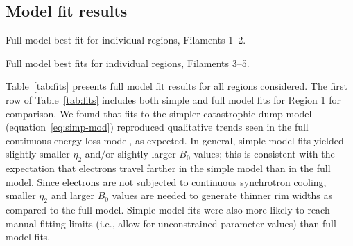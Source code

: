 \documentclass[iop, apj, numberedappendix, twocolappendix]{emulateapj}
\begin{document}
\subsection{Model fit results}
\label{sec:fit-results}

\begin{table*}[ht]
    \tiny
    \centering
    \caption{Full model best fit for individual regions, Filaments 1--2.
    \label{tab:fits}}
    
\end{table*}

\begin{table*}[ht]
    \tiny
    \centering
    \caption{Full model best fits for individual regions, Filaments 3--5.
    \label{tab:fits-pt2}}
    
\end{table*}


Table~\ref{tab:fits} presents full model fit results for all regions
considered.  The first row of Table~\ref{tab:fits} includes both simple and
full model fits for Region 1 for comparison.  We found that fits to the simpler
catastrophic dump model (equation~\eqref{eq:simp-mod}) reproduced qualitative
trends seen in the full continuous energy loss model, as expected.  In general,
simple model fits yielded slightly smaller $\eta_2$ and/or slightly larger
$B_0$ values; this is consistent with the expectation that electrons travel
farther in the simple model than in the full model. Since electrons are not
subjected to continuous synchrotron cooling, smaller $\eta_2$ and larger $B_0$
values are needed to generate thinner rim widths as compared to the full model.
Simple model fits were also more likely to reach manual fitting limits (i.e.,
allow for unconstrained parameter values) than full model fits.
\end{document}

